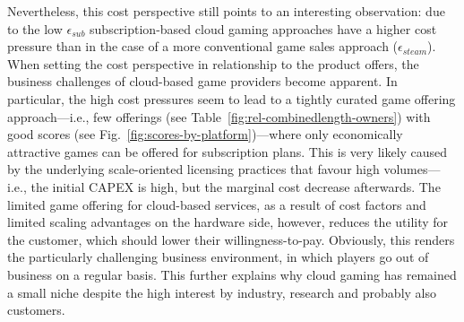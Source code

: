 Nevertheless, this cost perspective still points to an interesting observation: due to the low $\epsilon_{sub}$ subscription-based cloud gaming approaches have a higher cost pressure than in the case of a more conventional game sales approach ($\epsilon_{steam}$). When setting the cost perspective in relationship to the product offers, the business challenges of cloud-based game providers become apparent. In particular, the high cost pressures seem to lead to a tightly curated game offering approach---i.e., few offerings (see Table~\ref{fig:rel-combinedlength-owners}) with good scores (see Fig.~\ref{fig:scores-by-platform})---where only economically attractive games can be offered for subscription plans. This is very likely caused by the underlying scale-oriented licensing practices that favour high volumes---i.e., the initial CAPEX is high, but the marginal cost decrease afterwards. The limited game offering for cloud-based services, as a result of cost factors and limited scaling advantages on the hardware side, however, reduces the utility for the customer, which should lower their willingness-to-pay. Obviously, this renders the particularly challenging business environment, in which players go out of business on a regular basis. This further explains why cloud gaming has remained a small niche despite the high interest by industry, research and probably also customers.


















